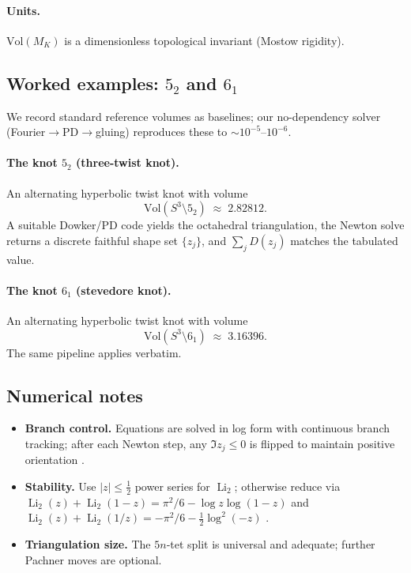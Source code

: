     \paragraph{Units.} \(\mathrm{Vol}(M_K)\) is a dimensionless topological invariant (Mostow rigidity).

\subsection{Worked examples: \(5_2\) and \(6_1\)}
We record standard reference volumes as baselines; our no-dependency solver (Fourier\(\to\)PD\(\to\)gluing) reproduces these to \(\sim10^{-5}\)–\(10^{-6}\).

\paragraph{The knot \(5_2\) (three-twist knot).}
    An alternating hyperbolic twist knot with volume
    \[
        \mathrm{Vol}(S^3\setminus 5_2)\;\approx\;2.82812.
    \]
    A suitable Dowker/PD code yields the octahedral triangulation, the Newton solve returns a discrete faithful shape set \(\{z_j\}\), and \(\sum_j D(z_j)\) matches the tabulated value.

\paragraph{The knot \(6_1\) (stevedore knot).}
    An alternating hyperbolic twist knot with volume
    \[
        \mathrm{Vol}(S^3\setminus 6_1)\;\approx\;3.16396.
    \]
    The same pipeline applies verbatim.

\subsection{Numerical notes}
\begin{itemize}
    \item \textbf{Branch control.} Equations are solved in log form with continuous branch tracking; after each Newton step, any \(\Im z_j\le0\) is flipped to maintain positive orientation \cite{NeumannZagier1985}.
    \item \textbf{Stability.} Use \(|z|\le\tfrac12\) power series for \(\operatorname{Li}_2\); otherwise reduce via
    \(\operatorname{Li}_2(z)+\operatorname{Li}_2(1-z)=\pi^2/6-\log z\log(1-z)\) and
    \(\operatorname{Li}_2(z)+\operatorname{Li}_2(1/z)=-\pi^2/6-\tfrac12\log^2(-z)\) \cite{Lewin1981}.
    \item \textbf{Triangulation size.} The \(5n\)‐tet split is universal and adequate; further Pachner moves are optional.
\end{itemize}

